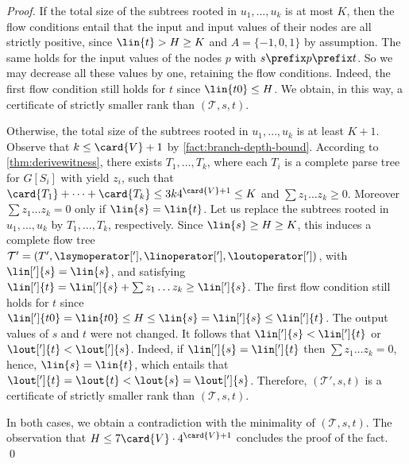 \begin{proof}
  If the total size of the subtrees rooted in $u_1, \ldots, u_k$ is
  at most $K$,
  then the flow conditions entail that
  the input and input values of their nodes are all strictly positive,
  since $\lin{t} > H \geq K$ and $A = \{-1,0,1\}$ by assumption.
  The same holds for the input values of the nodes $p$ with
  $s \prefix p \prefix t$.
  So we may decrease all these values by one,
  retaining the flow conditions.
  Indeed,
  the first flow condition still holds for $t$
  since $\lin{t0} \leq H$.
  We obtain, in this way,
  a certificate of strictly smaller rank than $(\mathcal{T}, s, t)$.

  Otherwise,
  the total size of the subtrees rooted in $u_1, \ldots, u_k$ is
  at least $K + 1$.
  Observe that $k \leq \card{V} + 1$ by \cref{fact:branch-depth-bound}.
  According to \cref{thm:derivewitness},
  there exists $T_1, \ldots, T_k$,
  where each $T_i$ is a complete parse tree for $G[S_i]$ with
  yield $z_i$,
  such that $\card{T_1} + \cdots + \card{T_k} \leq 3 k 4^{\card{V}+1} \leq K$
  and $\sum z_1\ldots z_k \geq 0$.
  Moreover $\sum z_1\ldots z_k = 0$ only if $\lin{s} = \lin{t}$.
  Let us replace the subtrees rooted in $u_1, \ldots, u_k$
  by $T_1, \ldots, T_k$, respectively.
  Since $\lin{s} \geq H \geq K$,
  this induces a complete flow tree
  $\mathcal{T}' = (T', \lsymoperator['], \linoperator['], \loutoperator['])$,
  with $\lin[']{s} = \lin{s}$, and
  satisfying
  $\lin[']{t} = \lin[']{s} + \sum z_1\ldots z_k \geq \lin[']{s}$.
  The first flow condition still holds for $t$ since
  $\lin[']{t0} = \lin{t0} \leq H \leq \lin{s} = \lin[']{s} \leq \lin[']{t}$.
  The output values of $s$ and $t$ were not changed.
  It follows that $\lin[']{s} < \lin[']{t}$ or $\lout[']{t} < \lout[']{s}$.
  Indeed,
  if $\lin[']{s} = \lin[']{t}$ then
  $\sum z_1\ldots z_k = 0$, hence, $\lin{s} = \lin{t}$,
  which entails that $\lout[']{t} = \lout{t} < \lout{s} = \lout[']{s}$.
  Therefore,
  $(\mathcal{T}', s, t)$ is a certificate
  of strictly smaller rank than $(\mathcal{T}, s, t)$.

  In both cases,
  we obtain a contradiction with the minimality of $(\mathcal{T}, s, t)$.
  The observation that $H \leq 7 \card{V} \cdot 4^{\card{V}+1}$
  concludes the proof of the fact.
  \qed
\end{proof}

